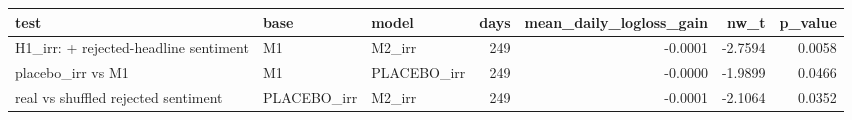 \begin{tabular}{lllrrrr}
\toprule
test & base & model & days & mean\_daily\_logloss\_gain & nw\_t & p\_value \\
\midrule
H1\_irr: + rejected-headline sentiment & M1 & M2\_irr & 249 & -0.0001 & -2.7594 & 0.0058 \\
placebo\_irr vs M1 & M1 & PLACEBO\_irr & 249 & -0.0000 & -1.9899 & 0.0466 \\
real vs shuffled rejected sentiment & PLACEBO\_irr & M2\_irr & 249 & -0.0001 & -2.1064 & 0.0352 \\
\bottomrule
\end{tabular}
